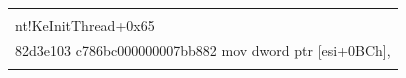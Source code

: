   \begin{table}\small %


  \begin{center}


    


  \begin{tabular}{|l|}


  \hline


  \\[-9pt]


{\sf nt!KeInitThread+0x65}\\


{\sf 82d3e103 c786bc000000007bb882 mov dword ptr [esi+0BCh]}, \\


    \hspace*{5mm}{\sf offset nt!KeServiceDescriptorTable (82b87b00)}\\


\hline


\end{tabular}





\vspace*{-3pt}








\parbox{274pt}{


}





\end{center}


\vspace*{-3pt}


\end{table}





